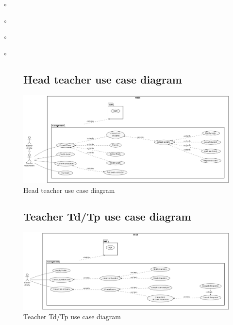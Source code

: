 \documentclass[]{uc2pfecaneva}
\begin{document}
\begin{list}{$\circ$}{}
\begin{list}{$\circ$}{}
\begin{list}{$\circ$}{}
\begin{list}{$\circ$}{}
    \begin{figure}
        \subsection{Head teacher use case diagram}
        \centering
        \includegraphics[width=450pt]{images/Module_Teacher}
        \caption{Head teacher use case diagram}
    \end{figure}

    \begin{figure}
        \subsection{Teacher Td/Tp use case diagram}
        \centering
        \includegraphics[width=\textwidth]{images/TP_TD_Teacher}
        \caption{Teacher Td/Tp use case diagram}
    \end{figure}

    \begin{figure}

\end{figure}
\end{list}
\end{list}
\end{list}
\end{list}
\end{document}
